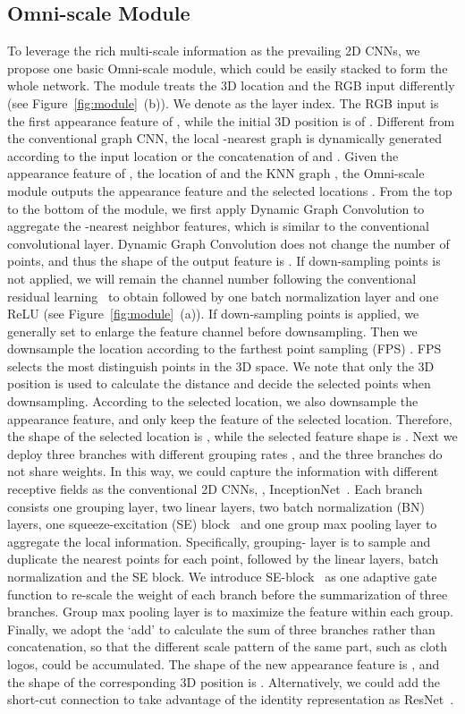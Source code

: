 \subsection{Omni-scale Module}
To leverage the rich multi-scale information as the prevailing 2D CNNs, we propose one basic Omni-scale module, which could be easily stacked to form the whole network. The module treats the 3D location and the RGB input differently (see Figure~\ref{fig:module}~(b)). 
We denote  as the layer index. The RGB input is the first appearance feature  of , while the initial 3D position is  of . Different from the conventional graph CNN, the local -nearest graph  is dynamically generated according to the input location  or the concatenation of  and . Given the appearance feature  of , the location  of  and the KNN graph , the Omni-scale module outputs the appearance feature  and the selected locations . 
From the top to the bottom of the module, we first apply Dynamic Graph Convolution to aggregate the -nearest neighbor features, which is similar to the conventional convolutional layer. Dynamic Graph Convolution does not change the number of points, and thus the shape of the output feature is . 
If down-sampling points is not applied, we will remain the channel number  following the conventional residual learning~\cite{he2016deep}  to obtain  followed by one batch normalization layer and one ReLU (see Figure~\ref{fig:module}~(a)). 
If down-sampling points is applied, we generally set  to enlarge the feature channel before downsampling. Then we downsample the location according to the farthest point sampling (FPS) \cite{qi2017pointnet++}. FPS selects the most distinguish points in the 3D space. We note that only the 3D position  is used to calculate the distance and decide the selected points when downsampling. According to the selected location, we also downsample the appearance feature, and only keep the feature of the selected location. Therefore, the shape of the selected location is , while the selected feature shape is . 
Next we deploy three branches with different grouping rates , and the three branches do not share weights. In this way, we could capture the information with different receptive fields as the conventional 2D CNNs, \ie, InceptionNet~\cite{szegedy2017inception}. Each branch consists one grouping layer, two linear layers, two batch normalization (BN) layers, one squeeze-excitation (SE) block~\cite{hu2018squeeze} and one group max pooling layer to aggregate the local information. 
Specifically, grouping- layer is to sample and duplicate the  nearest points for each point, followed by the linear layers, batch normalization and the SE block. We introduce SE-block~\cite{hu2018squeeze} as one adaptive gate function to re-scale the weight of each branch before the summarization of three branches. Group max pooling layer is to maximize the feature within each group. Finally, we adopt the `add' to calculate the sum of three branches rather than concatenation, so that the different scale pattern of the same part, such as cloth logos, could be accumulated. The shape of the new appearance feature  is , and the shape of the corresponding 3D position  is . Alternatively, we could add the short-cut connection to take advantage of the identity representation as ResNet~\cite{he2016deep}. 

